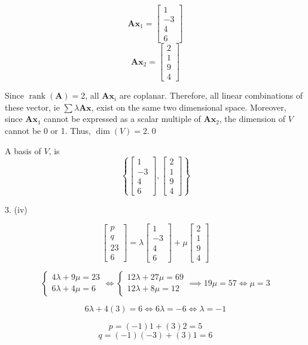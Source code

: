 \documentclass[a4paper]{article}
\newcommand{\vv}{\mathbf}
\newcommand{\rank}{\operatorname{rank}}
\begin{document}
\[\vv A\vv x_1=\begin{bmatrix}1\\-3\\4\\6\end{bmatrix}\]
\[\vv A\vv x_2=\begin{bmatrix}2\\1\\9\\4\end{bmatrix}\]

Since \(\rank(\vv A)=2\), all \(\vv A\vv x_i\) are coplanar. Therefore, all linear combinations of these vector, ie \(\sum\lambda\vv A\vv x\), exist on the same two dimensional space. Moreover, since \(\vv A\vv x_1\) cannot be expressed as a scalar multiple of \(\vv A\vv x_2\), the dimension of \(V\) cannot be 0 or 1. Thus, \(\dim(V)=2\).\qed

A basis of \(V\), is
\[\boxed{\left\{\begin{bmatrix}1\\-3\\4\\6\end{bmatrix},
\begin{bmatrix}2\\1\\9\\4\end{bmatrix}\right\}}\]


3. (iv)

\[\begin{bmatrix}p\\q\\23\\6\end{bmatrix}=\lambda\begin{bmatrix}1\\-3\\4\\6\end{bmatrix}+\mu\begin{bmatrix}2\\1\\9\\4\end{bmatrix}\]

\[\begin{cases}
        4\lambda+9\mu=23\\
        6\lambda+4\mu=6
\end{cases}
\iff
\begin{cases}
        12\lambda+27\mu=69\\
        12\lambda+8\mu=12
\end{cases}
\implies
19\mu=57\iff \mu=3\]

\[6\lambda+4(3)=6\iff6\lambda=-6\iff\lambda=-1\]

\[p=(-1)1+(3)2=\boxed5\]
\[q=(-1)(-3)+(3)1=\boxed6\]
\end{document}
